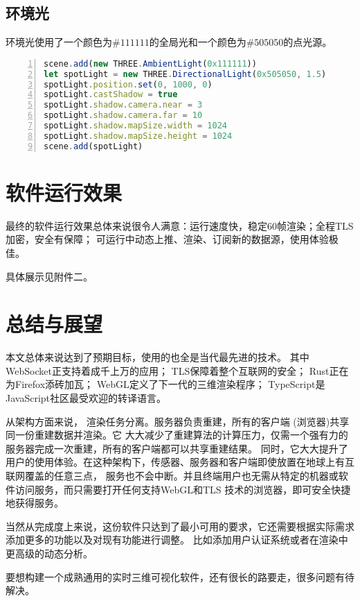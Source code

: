 \subsection{环境光}

环境光使用了一个颜色为$\#111111$的全局光和一个颜色为$\#505050$的点光源。

\begin{lstlisting}[language=JavaScript,
   backgroundcolor=\color{lightgray},
   extendedchars=true,
   basicstyle=\footnotesize\ttfamily,
   showstringspaces=false,
   showspaces=false,
   numbers=left,
   numberstyle=\footnotesize,
   numbersep=9pt,
   tabsize=2,
   breaklines=true,
   showtabs=false,
   captionpos=b]
scene.add(new THREE.AmbientLight(0x111111))
let spotLight = new THREE.DirectionalLight(0x505050, 1.5)
spotLight.position.set(0, 1000, 0)
spotLight.castShadow = true
spotLight.shadow.camera.near = 3
spotLight.shadow.camera.far = 10
spotLight.shadow.mapSize.width = 1024
spotLight.shadow.mapSize.height = 1024
scene.add(spotLight)
\end{lstlisting}

\section{软件运行效果}
最终的软件运行效果总体来说很令人满意：运行速度快，稳定60帧渲染；全程TLS加密，安全有保障；
可运行中动态上推、渲染、订阅新的数据源，使用体验极佳。

具体展示见附件二。

\section{总结与展望}
本文总体来说达到了预期目标，使用的也全是当代最先进的技术。
其中WebSocket正支持着成千上万的应用；
TLS保障着整个互联网的安全；
Rust正在为Firefox添砖加瓦；
WebGL定义了下一代的三维渲染程序；
TypeScript是JavaScript社区最受欢迎的转译语言。

从架构方面来说，
渲染任务分离。服务器负责重建，所有的客户端 (浏览器)共享同一份重建数据并渲染。它
大大减少了重建算法的计算压力，仅需一个强有力的服务器完成一次重建，所有的客户端都可以共享重建结果。 
同时，它大大提升了用户的使用体验。在这种架构下，传感器、服务器和客户端即使放置在地球上有互联网覆盖的任意三点，
服务也不会中断。并且终端用户也无需从特定的机器或软件访问服务，而只需要打开任何支持WebGL和TLS
技术的浏览器，即可安全快捷地获得服务。

当然从完成度上来说，这份软件只达到了最小可用的要求，它还需要根据实际需求添加更多的功能以及对现有功能进行调整。
比如添加用户认证系统或者在渲染中更高级的动态分析。

要想构建一个成熟通用的实时三维可视化软件，还有很长的路要走，很多问题有待解决。
